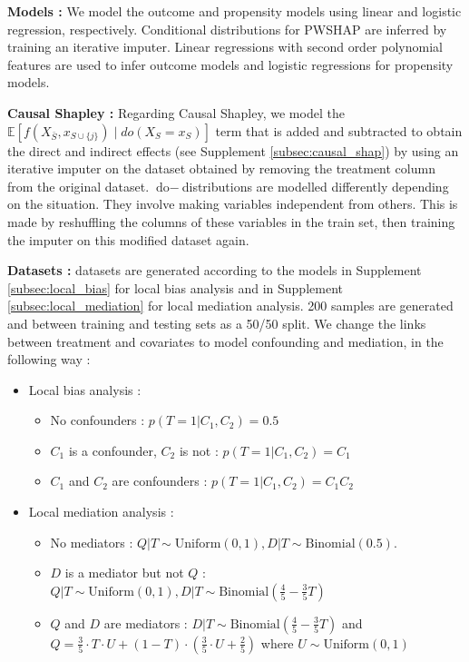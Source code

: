 \documentclass{article}
\theoremstyle{plain}
\theoremstyle{definition}
\theoremstyle{remark}
\theoremstyle{mystyle}
\begin{document}
\textbf{Models :} We model the outcome and propensity models using linear and logistic regression, respectively. Conditional distributions for PWSHAP are inferred by training an iterative imputer. Linear regressions with second order polynomial features are used to infer outcome models and logistic regressions for propensity models.

\textbf{Causal Shapley :} Regarding Causal Shapley, we model the $ \mathbb{E}\left[f\left(X_{\bar{S}}, x_{S \cup \{j\}}\right) \mid d o\left(X_{S}=x_{S}\right)\right]$ term that is added and subtracted to obtain the direct and indirect effects (see Supplement \ref{subsec:causal_shap}) by using an iterative imputer on the dataset obtained by removing the treatment column from the original dataset. $\text{do}-$distributions are modelled differently depending on the situation. They involve making variables independent from others. This is made by reshuffling the columns of these variables in the train set, then training the imputer on this modified dataset again.

\textbf{Datasets :} datasets are generated according to the models in Supplement \ref{subsec:local_bias} for local bias analysis and in Supplement \ref{subsec:local_mediation} for local mediation analysis. 200 samples are generated and between training and testing sets as a 50/50 split. We change the links between treatment and covariates to model confounding and mediation, in the following way :
\begin{itemize}
    \item Local bias analysis :
    \begin{itemize}
        \item No confounders : $p(T=1|C_1,C_2) = 0.5$
        \item $C_1$ is a confounder, $C_2$ is not : $p(T=1|C_1,C_2) = C_1$
        \item $C_1$ and $C_2$ are confounders : $p(T=1|C_1,C_2) = C_1C_2$
    \end{itemize}
    \item Local mediation analysis :
    \begin{itemize}
        \item No mediators : $Q|T \sim \text{Uniform}(0,1), D|T \sim \text{Binomial}(0.5)$.
        \item $D$ is a mediator but not $Q$ : $Q|T \sim \text{Uniform}(0,1), D|T \sim \text{Binomial}(\frac{4}{5} - \frac{3}{5}T)$
        \item $Q$ and $D$ are mediators : $D|T \sim \text{Binomial}(\frac{4}{5} - \frac{3}{5}T)$ and $Q = \frac{3}{5} \cdot T \cdot U + (1-T) \cdot (\frac{3}{5} \cdot U + \frac{2}{5})$ where $U \sim \text{Uniform}(0,1)$
    \end{itemize}
\end{itemize}
\end{document}
